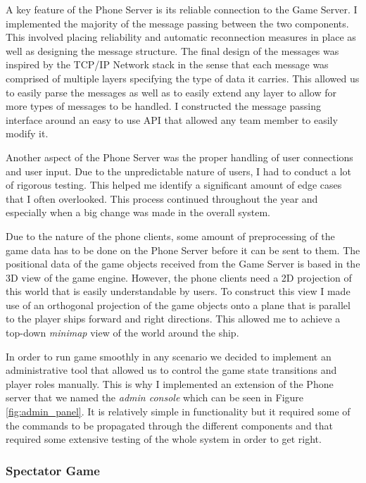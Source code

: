 \documentclass[a4paper,11pt]{article}
\begin{document}
A key feature of the Phone Server is its reliable connection to the Game Server. I implemented the majority of the message passing between the two components. This involved placing reliability and automatic reconnection measures in place as well as designing the message structure. The final design of the messages was inspired by the TCP/IP Network stack in the sense that each message was comprised of multiple layers specifying the type of data it carries. This allowed us to easily parse the messages as well as to easily extend any layer to allow for more types of messages to be handled. I constructed the message passing interface around an easy to use API that allowed any team member to easily modify it.

Another aspect of the Phone Server was the proper handling of user connections and user input. Due to the unpredictable nature of users, I had to conduct a lot of rigorous testing. This helped me identify a significant amount of edge cases that I often overlooked. This process continued throughout the year and especially when a big change was made in the overall system.

Due to the nature of the phone clients, some amount of preprocessing of the game data has to be done on the Phone Server before it can be sent to them. The positional data of the game objects received from the Game Server is based in the 3D view of the game engine. However, the phone clients need a 2D projection of this world that is easily understandable by users. To construct this view I made use of an orthogonal projection of the game objects onto a plane that is parallel to the player ships forward and right directions. This allowed me to achieve a top-down \emph{minimap} view of the world around the ship.

In order to run game smoothly in any scenario we decided to implement an administrative tool that allowed us to control the game state transitions and player roles manually. This is why I implemented an extension of the Phone server that we named the \emph{admin console} which can be seen in Figure \ref{fig:admin_panel}. It is relatively simple in functionality but it required some of the commands to be propagated through the different components and that required some extensive testing of the whole system in order to get right.

\subsubsection{Spectator Game}
\end{document}
